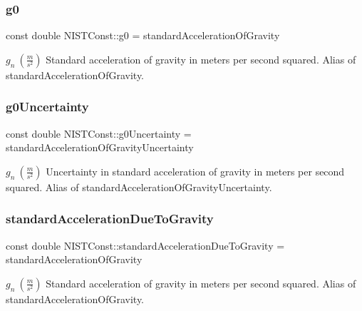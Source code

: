 \subsubsection{\texorpdfstring{g0}{g0}}
{\footnotesize\ttfamily const double N\+I\+S\+T\+Const\+::g0 = standard\+Acceleration\+Of\+Gravity}

$g_n \ (\frac{m}{s^2})$ Standard acceleration of gravity in meters per second squared. Alias of standard\+Acceleration\+Of\+Gravity. \mbox{\label{group___n_i_s_t_const-_gravity_acceleration_ga2d6c266044ae894212cef601eb974a0f}} 
\subsubsection{\texorpdfstring{g0\+Uncertainty}{g0Uncertainty}}
{\footnotesize\ttfamily const double N\+I\+S\+T\+Const\+::g0\+Uncertainty = standard\+Acceleration\+Of\+Gravity\+Uncertainty}

$g_n \ (\frac{m}{s^2})$ Uncertainty in standard acceleration of gravity in meters per second squared. Alias of standard\+Acceleration\+Of\+Gravity\+Uncertainty. \mbox{\label{group___n_i_s_t_const-_gravity_acceleration_ga7d417cb0027680e48ff481ab68a0864e}} 
\subsubsection{\texorpdfstring{standard\+Acceleration\+Due\+To\+Gravity}{standardAccelerationDueToGravity}}
{\footnotesize\ttfamily const double N\+I\+S\+T\+Const\+::standard\+Acceleration\+Due\+To\+Gravity = standard\+Acceleration\+Of\+Gravity}

$g_n \ (\frac{m}{s^2})$ Standard acceleration of gravity in meters per second squared. Alias of standard\+Acceleration\+Of\+Gravity. \mbox{\label{group___n_i_s_t_const-_gravity_acceleration_ga80a7a9469b199febff956dcbda1b5e1b}} 
